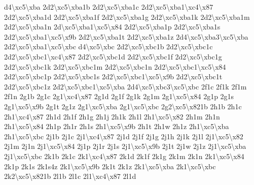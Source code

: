 \begin{DoxyCompactItemize}
d4\textbackslash{}xc5\textbackslash{}xba 2d2\textbackslash{}xc5\textbackslash{}xba1b 2d2\textbackslash{}xc5\textbackslash{}xba1c 2d2\textbackslash{}xc5\textbackslash{}xba1\textbackslash{}xc4\textbackslash{}x87 2d2\textbackslash{}xc5\textbackslash{}xba1d 2d2\textbackslash{}xc5\textbackslash{}xba1f 2d2\textbackslash{}xc5\textbackslash{}xba1g 2d2\textbackslash{}xc5\textbackslash{}xba1k 2d2\textbackslash{}xc5\textbackslash{}xba1m 2d2\textbackslash{}xc5\textbackslash{}xba1n 2d\textbackslash{}xc5\textbackslash{}xba1\textbackslash{}xc5\textbackslash{}x84 2d2\textbackslash{}xc5\textbackslash{}xba1p 2d2\textbackslash{}xc5\textbackslash{}xba1s 2d2\textbackslash{}xc5\textbackslash{}xba1\textbackslash{}xc5\textbackslash{}x9b 2d2\textbackslash{}xc5\textbackslash{}xba1t 2d2\textbackslash{}xc5\textbackslash{}xba1z 2d4\textbackslash{}xc5\textbackslash{}xba3\textbackslash{}xc5\textbackslash{}xba 2d2\textbackslash{}xc5\textbackslash{}xba1\textbackslash{}xc5\textbackslash{}xbc d4\textbackslash{}xc5\textbackslash{}xbc 2d2\textbackslash{}xc5\textbackslash{}xbc1b 2d2\textbackslash{}xc5\textbackslash{}xbc1c 2d2\textbackslash{}xc5\textbackslash{}xbc1\textbackslash{}xc4\textbackslash{}x87 2d2\textbackslash{}xc5\textbackslash{}xbc1d 2d2\textbackslash{}xc5\textbackslash{}xbc1f 2d2\textbackslash{}xc5\textbackslash{}xbc1g 2d2\textbackslash{}xc5\textbackslash{}xbc1k 2d2\textbackslash{}xc5\textbackslash{}xbc1m 2d2\textbackslash{}xc5\textbackslash{}xbc1n 2d2\textbackslash{}xc5\textbackslash{}xbc1\textbackslash{}xc5\textbackslash{}x84 2d2\textbackslash{}xc5\textbackslash{}xbc1p 2d2\textbackslash{}xc5\textbackslash{}xbc1s 2d2\textbackslash{}xc5\textbackslash{}xbc1\textbackslash{}xc5\textbackslash{}x9b 2d2\textbackslash{}xc5\textbackslash{}xbc1t 2d2\textbackslash{}xc5\textbackslash{}xbc1z 2d2\textbackslash{}xc5\textbackslash{}xbc1\textbackslash{}xc5\textbackslash{}xba 2d4\textbackslash{}xc5\textbackslash{}xbc3\textbackslash{}xc5\textbackslash{}xbc 2f1c 2f1k 2f1m 2f1n 2g1b 2g1c 2g1\textbackslash{}xc4\textbackslash{}x87 2g1d 2g1f 2g1k 2g1m 2g1\textbackslash{}xc5\textbackslash{}x84 2g1p 2g1s 2g1\textbackslash{}xc5\textbackslash{}x9b 2g1t 2g1z 2g1\textbackslash{}xc5\textbackslash{}xba 2g1\textbackslash{}xc5\textbackslash{}xbc 2g2\textbackslash{}xc5\textbackslash{}x821b 2h1b 2h1c 2h1\textbackslash{}xc4\textbackslash{}x87 2h1d 2h1f 2h1g 2h1j 2h1k 2h1l 2h1\textbackslash{}xc5\textbackslash{}x82 2h1m 2h1n 2h1\textbackslash{}xc5\textbackslash{}x84 2h1p 2h1r 2h1s 2h1\textbackslash{}xc5\textbackslash{}x9b 2h1t 2h1w 2h1z 2h1\textbackslash{}xc5\textbackslash{}xba 2h1\textbackslash{}xc5\textbackslash{}xbc 2j1b 2j1c 2j1\textbackslash{}xc4\textbackslash{}x87 2j1d 2j1f 2j1g 2j1h 2j1k 2j1l 2j1\textbackslash{}xc5\textbackslash{}x82 2j1m 2j1n 2j1\textbackslash{}xc5\textbackslash{}x84 2j1p 2j1r 2j1s 2j1\textbackslash{}xc5\textbackslash{}x9b 2j1t 2j1w 2j1z 2j1\textbackslash{}xc5\textbackslash{}xba 2j1\textbackslash{}xc5\textbackslash{}xbc 2k1b 2k1c 2k1\textbackslash{}xc4\textbackslash{}x87 2k1d 2k1f 2k1g 2k1m 2k1n 2k1\textbackslash{}xc5\textbackslash{}x84 2k1p 2k1s 2k1s4z 2k1\textbackslash{}xc5\textbackslash{}x9b 2k1t 2k1z 2k1\textbackslash{}xc5\textbackslash{}xba 2k1\textbackslash{}xc5\textbackslash{}xbc 2k2\textbackslash{}xc5\textbackslash{}x821b 2l1b 2l1c 2l1\textbackslash{}xc4\textbackslash{}x87 2l1d 
\end{DoxyCompactItemize}
